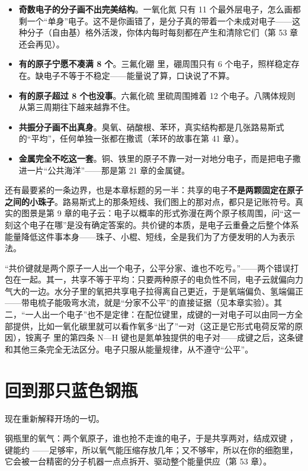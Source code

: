 \begin{itemize}[itemsep=2pt]
\item \textbf{奇数电子的分子画不出完美结构}。一氧化氮  只有 11 个最外层电子，怎么画都剩一个“单身”电子。这不是你画错了，是分子真的带着一个未成对电子——这种分子（自由基）格外活泼，你体内每时每刻都在产生和清除它们（第 53 章还会再见）。
\item \textbf{有的原子宁愿不凑满 8 个}。三氟化硼  里，硼周围只有 6 个电子，照样稳定存在。缺电子不等于不稳定——能量说了算，口诀说了不算。
\item \textbf{有的原子超过 8 个也没事}。六氟化硫  里硫周围摊着 12 个电子。八隅体规则从第三周期往下越来越靠不住。
\item \textbf{共振分子画不出真身}。臭氧、硝酸根、苯环，真实结构都是几张路易斯式的“平均”，任何单独一张都在撒谎（苯环的故事在第 41 章）。
\item \textbf{金属完全不吃这一套}。铜、铁里的原子不靠一对一对地分电子，而是把电子撒进一片“公共海洋”——那是第 21 章的金属键。
\end{itemize}

还有最要紧的一条边界，也是本章标题的另一半：共享的电子\textbf{不是两颗固定在原子之间的小珠子}。路易斯式上的那条短线、我们图上的那对点，都只是记账符号。真实的图景是第 9 章的电子云：电子以概率的形式弥漫在两个原子核周围，问“这一刻这个电子在哪”是没有确定答案的。共价键的本质，是电子云重叠之后整个体系能量降低这件事本身——珠子、小棍、短线，全是我们为了方便发明的人为表示法。

\begin{wuqu}
“共价键就是两个原子一人出一个电子，公平分家、谁也不吃亏。”——两个错误打包在一起。其一，共享不等于平均：只要两种原子的电负性不同，电子云就偏向力气大的一边。水分子里的氧把共享电子拉得离自己更近，于是氧端偏负、氢端偏正——带电梳子能吸弯水流，就是“分家不公平”的直接证据（见本章实验）。其二，“一人出一个电子”也不是定律：在配位键里，成键的一对电子可以由同一方全部提供，比如一氧化碳里就可以看作氧多“出了”一对（这正是它形式电荷反常的原因），铵离子  里的第四条 N—H 键也是氮单独提供的电子对——成键之后，这条键和其他三条完全无法区分。电子只服从能量规律，从不遵守“公平”。
\end{wuqu}

\section{回到那只蓝色钢瓶}

现在重新解释开场的一切。

钢瓶里的氧气：两个氧原子，谁也抢不走谁的电子，于是共享两对，结成双键 ，键能约 ——足够牢，所以氧气能压缩存放几年；又不够牢，所以在你的细胞里，它会被一台精密的分子机器一点点拆开、驱动整个能量供应（第 53 章）。

